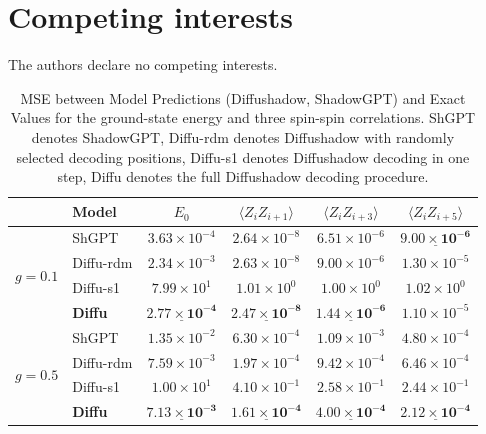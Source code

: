 \documentclass[pdflatex,sn-nature]{sn-jnl}%
\theoremstyle{thmstyleone}%
\theoremstyle{thmstyletwo}%
\theoremstyle{thmstylethree}%
\begin{document}
\section*{Competing interests}
The authors declare no competing interests.


\setcounter{figure}{0}
\setcounter{table}{0}
\renewcommand{\figurename}{Extended Data Fig.}
\renewcommand{\tablename}{Extended Data Table}


\begin{table}[htbp]
\centering
\setlength{\tabcolsep}{7pt}
\caption{MSE between Model Predictions (Diffushadow, ShadowGPT) and Exact Values for the ground-state energy and three spin-spin correlations. ShGPT denotes ShadowGPT, Diffu-rdm denotes Diffushadow with randomly selected decoding positions, Diffu-s1 denotes Diffushadow decoding in one step, Diffu denotes the full Diffushadow decoding procedure.}
\label{tab:mse_table}
\begin{tabular}{llcccc}
\hline
 &Model & $E_0$ & $\langle Z_iZ_{i+1}\rangle$ & $\langle Z_iZ_{i+3}\rangle$ & $\langle Z_iZ_{i+5}\rangle$\\
\hline
\multirow{4}{*}{$g=0.1$} 
& ShGPT      & $3.63{\times}10^{-4}$ & $2.64{\times}10^{-8}$ & $6.51{\times}10^{-6}$ & $\underline{\mathbf{9.00{\times}10^{-6}}}$\\
& Diffu-rdm & $2.34{\times}10^{-3}$ & $2.63{\times}10^{-8}$ & $9.00{\times}10^{-6}$ & $1.30{\times}10^{-5}$\\
& Diffu-s1  & $7.99{\times}10^{1}$ & $1.01{\times}10^{0}$ & $1.00{\times}10^{0}$ & $1.02{\times}10^{0}$\\
& \textbf{Diffu}    & $\underline{\mathbf{2.77{\times}10^{-4}}}$ & $\underline{\mathbf{2.47{\times}10^{-8}}}$ & $\underline{\mathbf{1.44{\times}10^{-6}}}$ & $1.10{\times}10^{-5}$\\
\hline
\multirow{4}{*}{$g=0.5$} 
& ShGPT      & $1.35{\times}10^{-2}$ & $6.30{\times}10^{-4}$ & $1.09{\times}10^{-3}$ & $4.80{\times}10^{-4}$\\
& Diffu-rdm & $7.59{\times}10^{-3}$ & $1.97{\times}10^{-4}$ & $9.42{\times}10^{-4}$ & $6.46{\times}10^{-4}$\\
& Diffu-s1  & $1.00{\times}10^{1}$ & $4.10{\times}10^{-1}$ & $2.58{\times}10^{-1}$ & $2.44{\times}10^{-1}$\\
& \textbf{Diffu}    & $\underline{\mathbf{7.13{\times}10^{-3}}}$ & $\underline{\mathbf{1.61{\times}10^{-4}}}$ & $\underline{\mathbf{4.00{\times}10^{-4}}}$ & $\underline{\mathbf{2.12{\times}10^{-4}}}$\\

\end{tabular}
\end{table}
\end{document}
